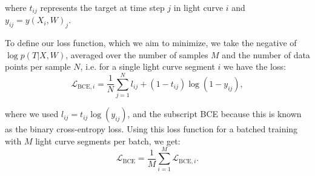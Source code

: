 \noindent where $t_{ij}$ represents the target at time step $j$ in light curve $i$ and $y_{ij} = y(X_i,W)_j$.

To define our loss function, which we aim to minimize, we take the negative of $\log p(T|X,W)$, averaged over the number of samples $M$ and the number of data points per sample $N$, i.e. for a single light curve segment $i$ we have the loss:
\begin{equation}
    \label{eq:bce_loss}
    \mathcal{L}_{\text{BCE},i} = \frac{1}{N}\sum^{N}_{j=1} l_{ij} + (1 - t_{ij}) \log (1 - y_{ij}),
\end{equation}

\noindent where we used $l_{ij} = t_{ij} \log( y_{ij})$, and the subscript BCE because this is known as the binary cross-entropy loss.
Using this loss function for a batched training with $M$ light curve segments per batch, we get:
\begin{equation}
    \mathcal{L}_{\text{BCE}} = \frac{1}{M} \sum_{i=1}^M \mathcal{L}_{\text{BCE},i}.
\end{equation}

